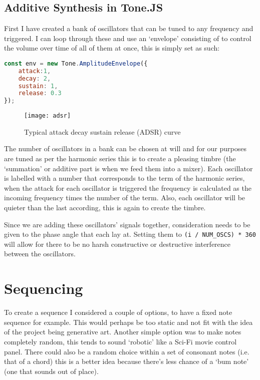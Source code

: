 \subsection{Additive Synthesis in Tone.JS}
First I have created a bank of oscillators that can be tuned to any frequency
and triggered. I can loop through these and use an `envelope' consisting of to
control the volume over time of all of them at once, this is simply set as such:

\begin{lstlisting}[language=JavaScript]
const env = new Tone.AmplitudeEnvelope({
    attack:1,
    decay: 2,
    sustain: 1,
    release: 0.3
});
\end{lstlisting}

\begin{figure}[H]
    \centering
    \texttt{[image: adsr]}
    \caption{Typical attack decay sustain release (ADSR) curve}
\end{figure}

The number of oscillators in a bank can be chosen at will and for our purposes
are tuned as per the harmonic series this is to create a pleasing timbre (the
`summation' or additive part is when we feed them into a mixer). 
Each oscillator is labelled with a number that corresponds to the term of the
harmonic series, when the attack for each oscillator is triggered the frequency
is calculated as the incoming frequency times the number of the term. Also, each
oscillator will be quieter than the last according, this is again to create
the timbre.

Since we are adding these oscillators' signals together, consideration needs to
be given to the phase angle that each lay at. Setting them to \verb|(i / NUM_OSCS) * 360| 
will allow for there to be no harsh constructive or destructive interference
between the oscillators.


\section{Sequencing}
\label{Sequencing}
To create a sequence I considered a couple of options, to have a fixed note
sequence for example. This would perhaps be too static and not fit with the idea
of the project being generative art. Another simple option was to make notes
completely random, this tends to sound `robotic' like a Sci-Fi movie control
panel. There could also be a random choice within a set of consonant notes (i.e.
that of a chord) this is a better idea because there's less chance of a `bum
note' (one that sounds out of place).

